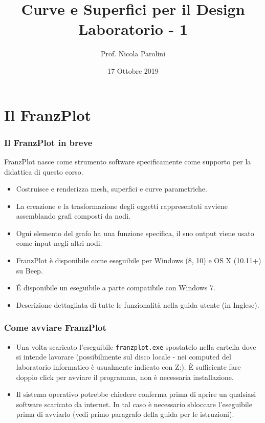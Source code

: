 \documentclass{beamer}
\title[Curve e Sup. - Lab 1]{Curve e Superfici per il Design \\ Laboratorio - 1}
\author[Prof. Parolini]{Prof. Nicola Parolini}
\date{17 Ottobre 2019}
\newcommand{\frnzplt}{FranzPlot }
\begin{document}
\begin{frame}
\maketitle
\end{frame}
\section{Il \frnzplt}
\begin{frame}
\frametitle{Il \frnzplt in breve}
\frnzplt nasce come strumento software specificamente come supporto per la didattica di questo corso.
\begin{itemize}
  \item Costruisce e renderizza mesh, superfici e curve parametriche.
  \item La creazione e la trasformazione degli oggetti rappresentati avviene assemblando grafi composti da nodi.
  \item Ogni elemento del grafo ha una funzione specifica, il suo output viene usato come input negli altri nodi.
  \item \frnzplt \`e disponibile come eseguibile per Windows (8, 10) e OS X (10.11+) su Beep.
  \item \'E disponibile un eseguibile a parte compatibile con Windows 7.
  \item Descrizione dettagliata di tutte le funzionalit\`a nella guida utente (in Inglese).
\end{itemize}
\end{frame}
\begin{frame}
\frametitle{Come avviare \frnzplt}
\begin{itemize}
\item Una volta scaricato l'eseguibile \texttt{franzplot.exe} spostatelo nella
cartella dove si intende lavorare (possibilmente sul disco locale - nei
computed del laboratorio informatico \`e usualmente indicato con Z:).
\`E sufficiente fare doppio click per avviare il programma, non \`e necessaria installazione.
\item Il sistema operativo potrebbe chiedere conferma prima di aprire un qualsiasi software
scaricato da internet. In tal caso \`e necessario sbloccare l'eseguibile prima di avviarlo
(vedi primo paragrafo della guida per le istruzioni).
\end{itemize}
\end{frame}
\end{document}
